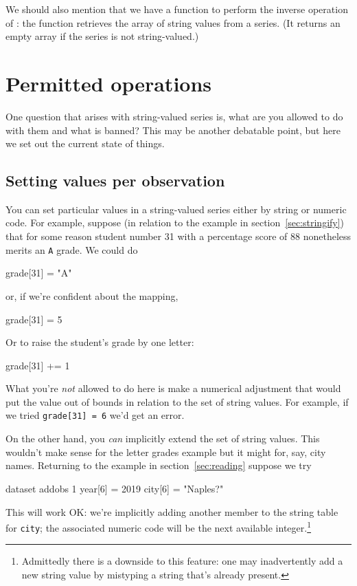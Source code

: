 We should also mention that we have a function to perform the inverse
operation of : the  function
retrieves the array of string values from a series. (It returns an
empty array if the series is not string-valued.)

\section{Permitted operations}

One question that arises with string-valued series is, what are you
allowed to do with them and what is banned? This may be another
debatable point, but here we set out the current state of things.

\subsection{Setting values per observation}

You can set particular values in a string-valued series either by
string or numeric code. For example, suppose (in relation to the
example in section~\ref{sec:stringify}) that for some reason student
number 31 with a percentage score of 88 nonetheless merits an
\texttt{A} grade. We could do
\begin{code}
grade[31] = "A"
\end{code}
or, if we're confident about the mapping,
\begin{code}
grade[31] = 5
\end{code}
Or to raise the student's grade by one letter:
\begin{code}
grade[31] += 1
\end{code}

What you're \textit{not} allowed to do here is make a numerical
adjustment that would put the value out of bounds in relation to the
set of string values. For example, if we tried \texttt{grade[31] = 6}
we'd get an error. 

On the other hand, you \textit{can} implicitly extend the set of
string values. This wouldn't make sense for the letter grades example
but it might for, say, city names. Returning to the example in
section~\ref{sec:reading} suppose we try
%
\begin{code}
dataset addobs 1
year[6] = 2019
city[6] = "Naples?"
\end{code}
%
This will work OK: we're implicitly adding another member to the
string table for \texttt{city}; the associated numeric code will be
the next available integer.\footnote{Admittedly there is a downside to
  this feature: one may inadvertently add a new string value by
  mistyping a string that's already present.}

